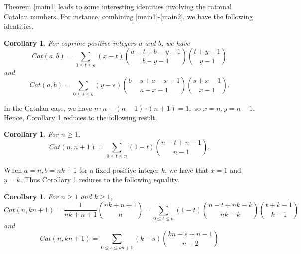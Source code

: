 \documentclass[a4paper,12pt]{article}
\newtheorem{cor}[thm]{Corollary}
\newtheorem{conj}[thm]{Conjecture}
\newtheorem{problem}[thm]{Problem}
\newtheorem{exam}[thm]{\it Example}
\begin{document}
Theorem \ref{main1} leads to some interesting identities involving the rational Catalan numbers. For instance, combining \eqref{main1}-\eqref{main2}, we have the following identities.

\begin{cor}\label{cor1}
For coprime positive integers $a$ and $b$, we have
\[Cat(a,b) = \sum_{0\leq t\leq a}   (x-t) \binom{a-t+b-y-1}{b-y-1} \binom{t+y-1}{y-1} \]
and
\[Cat(a,b) =\sum_{0\leq s\leq b}   (y-s) \binom{b-s+a-x-1}{a-x-1} \binom{s+x-1}{x-1}.
\]

\end{cor}


In the Catalan case, we have $n\cdot n-(n-1)\cdot(n+1)=1,$ so $x=n,y=n-1$. Hence, Corollary \ref{cor1} reduces to the following result.

\begin{cor}\label{CatalanId}
For $n\geq 1$,
$$Cat(n,n+1)= \sum_{0\leq t\leq n}   (1-t) \binom{n-t+n-1}{n-1}. $$
\end{cor}


When $a=n,b=nk+1$ for a fixed positive integer $k$, we have that $x=1$ and $y=k$. Thus Corollary \ref{cor1} reduces to the following equality.

\begin{cor}
For $n\geq 1$ and $k\geq 1$,
$$Cat(n,kn+1) = \frac{1}{nk+n+1} \binom{nk+n+1}{n}=
   \sum_{0\leq t\leq n}   (1-t) \binom{n-t+nk-k}{nk-k} \binom{t+k-1}{k-1} $$
and  %
$$Cat(n,kn+1) =\sum_{0\leq s \leq kn+1}   (k-s) \binom{kn-s+n-1}{n-2} %
$$
\end{cor}




%
%


%
\end{document}
